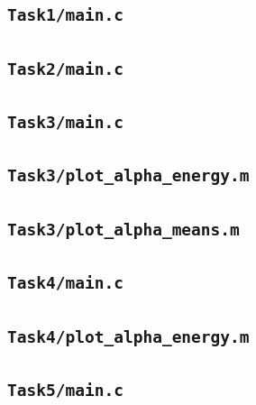 \subsection{\texttt{Task1/main.c}}


\subsection{\texttt{Task2/main.c}}


\subsection{\texttt{Task3/main.c}}


\subsection{\texttt{Task3/plot\_alpha\_energy.m}}


\subsection{\texttt{Task3/plot\_alpha\_means.m}}


\subsection{\texttt{Task4/main.c}}


\subsection{\texttt{Task4/plot\_alpha\_energy.m}}


\subsection{\texttt{Task5/main.c}}




